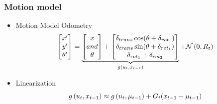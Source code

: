    \begin{frame}
    \frametitle{Motion model}
   
    \begin{itemize}
    \item Motion Model Odometry
    \begin{equation*}
    \begin{bmatrix}
    x^{\prime} \\
    y^{\prime} \\
    \theta^{\prime}
    \end{bmatrix} =
    \underbrace{
    \begin{bmatrix}
    x \\
    and \\
    \theta
    \end{bmatrix} +
    \begin{bmatrix}
    \delta_{trans}\cos(\theta+\delta_{rot_{1}}) \\
    \delta_{trans}\sin(\theta+\delta_{rot_{1}}) \\
    \delta_{rot_{1}} + \delta_{rot_{2}}
    \end{bmatrix}
    }_{g\left( u_{t}, x_{t-1} \right)} + \mathcal{N}\left( {0}, {R_{t}} \right)
    \end{equation*}
    \item Linearization
    \begin{equation*}
    g\left( u_{t}, x _{t-1} \right) \approx g\left( u_{t}, \mu _{t-1} \right) + G_{t}(x _{t-1}-\mu _{t-1})
    \end{equation*}
    \end{itemize}
   
   \end{frame}
   
